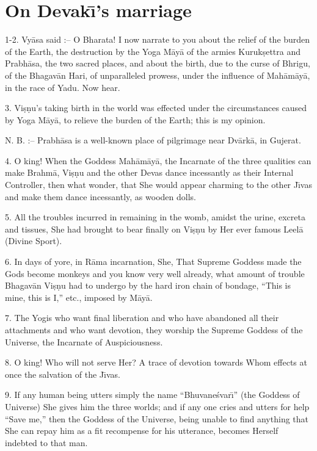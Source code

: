 \chapter{On Devak\={\i}'s marriage}

1-2. Vy\=asa said :-- O Bharata! I now narrate to you about the relief of the burden of the Earth, the destruction by the Yoga M\=ay\=a of the armies Kuruk\d{s}ettra and Prabh\=asa, the two sacred places, and about the birth, due to the curse of Bhrigu, of the Bhagav\=an Hari, of unparalleled prowess, under the influence of Mah\=am\=ay\=a, in the race of Yadu. Now hear.

3. Vi\d{s}\d{n}u's taking birth in the world was effected under the circumstances caused by Yoga M\=ay\=a, to relieve the burden of the Earth; this is my opinion.

N. B. :-- Prabh\=asa is a well-known place of pilgrimage near Dv\=ark\=a, in Gujerat.

4. O king! When the Goddess Mah\=am\=ay\=a, the Incarnate of the three qualities can make Brahm\=a, Vi\d{s}\d{n}u and the other Devas dance incessantly as their Internal Controller, then what wonder, that She would appear charming to the other J\={\i}vas and make them dance incessantly, as wooden dolls.

5. All the troubles incurred in remaining in the womb, amidst the urine, excreta and tissues, She had brought to bear finally on Vi\d{s}\d{n}u by Her ever famous Leel\=a (Divine Sport).

6. In days of yore, in R\=ama incarnation, She, That Supreme Goddess made the Gods become monkeys and you know very well already, what amount of trouble Bhagav\=an Vi\d{s}\d{n}u had to undergo by the hard iron chain of bondage, ``This is mine, this is I,'' etc., imposed by M\=ay\=a.

7. The Yogis who want final liberation and who have abandoned all their attachments and who want devotion, they worship the Supreme Goddess of the Universe, the Incarnate of Auspiciousness.

8. O king! Who will not serve Her? A trace of devotion towards Whom effects at once the salvation of the J\={\i}vas.

9. If any human being utters simply the name ``Bhuvane\'svar\={\i}'' (the Goddess of Universe) She gives him the three worlds; and if any one cries and utters for help ``Save me,'' then the Goddess of the Universe, being unable to find anything that She can repay him as a fit recompense for his utterance, becomes Herself indebted to that man.

